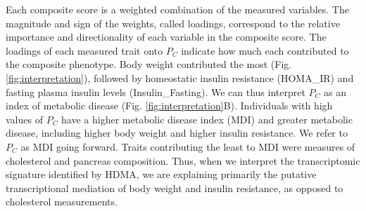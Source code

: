 \documentclass[
]{article}
\begin{document}
Each composite score is a weighted combination of the measured
variables. The magnitude and sign of the weights, called loadings,
correspond to the relative importance and directionality of each
variable in the composite score. The loadings of each measured trait
onto \(P_C\) indicate how much each contributed to the composite
phenotype. Body weight contributed the most (Fig.
\ref{fig:interpretation}), followed by homeostatic insulin resistance
(HOMA\_IR) and fasting plasma insulin levels (Insulin\_Fasting). We can
thus interpret \(P_C\) as an index of metabolic disease (Fig.
\ref{fig:interpretation}B). Individuals with high values of \(P_C\) have
a higher metabolic disease index (MDI) and greater metabolic disease,
including higher body weight and higher insulin resistance. We refer to
\(P_C\) as MDI going forward. Traits contributing the least to MDI were
measures of cholesterol and pancreas composition. Thus, when we
interpret the transcriptomic signature identified by HDMA, we are
explaining primarily the putative transcriptional mediation of body
weight and insulin resistance, as opposed to cholesterol measurements.
\end{document}
